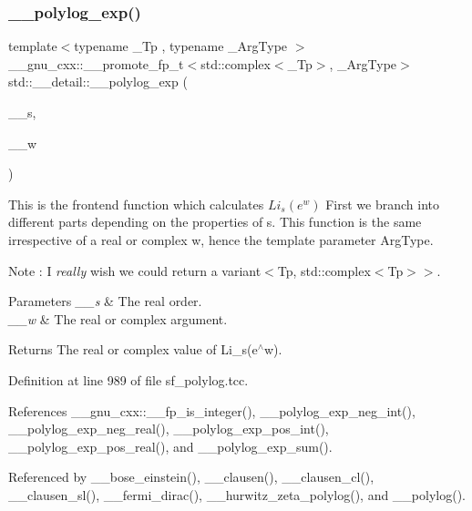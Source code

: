 \subsubsection{\texorpdfstring{\+\_\+\+\_\+polylog\+\_\+exp()}{\_\_polylog\_exp()}}
{\footnotesize\ttfamily template$<$typename \+\_\+\+Tp , typename \+\_\+\+Arg\+Type $>$ \\
\+\_\+\+\_\+gnu\+\_\+cxx\+::\+\_\+\+\_\+promote\+\_\+fp\+\_\+t$<$std\+::complex$<$\+\_\+\+Tp$>$, \+\_\+\+Arg\+Type$>$ std\+::\+\_\+\+\_\+detail\+::\+\_\+\+\_\+polylog\+\_\+exp (\begin{DoxyParamCaption}\item[{\+\_\+\+Tp}]{\+\_\+\+\_\+s,  }\item[{\+\_\+\+Arg\+Type}]{\+\_\+\+\_\+w }\end{DoxyParamCaption})}

This is the frontend function which calculates $ Li_s(e^w) $ First we branch into different parts depending on the properties of s. This function is the same irrespective of a real or complex w, hence the template parameter Arg\+Type.

\begin{DoxyNote}{Note}
\+: I {\itshape really} wish we could return a variant$<$Tp, std\+::complex$<$\+Tp$>$$>$.
\end{DoxyNote}

\begin{DoxyParams}{Parameters}
{\em \+\_\+\+\_\+s} & The real order. \\
\hline
{\em \+\_\+\+\_\+w} & The real or complex argument. \\
\hline
\end{DoxyParams}
\begin{DoxyReturn}{Returns}
The real or complex value of Li\+\_\+s(e$^\wedge$w). 
\end{DoxyReturn}


Definition at line 989 of file sf\+\_\+polylog.\+tcc.



References \+\_\+\+\_\+gnu\+\_\+cxx\+::\+\_\+\+\_\+fp\+\_\+is\+\_\+integer(), \+\_\+\+\_\+polylog\+\_\+exp\+\_\+neg\+\_\+int(), \+\_\+\+\_\+polylog\+\_\+exp\+\_\+neg\+\_\+real(), \+\_\+\+\_\+polylog\+\_\+exp\+\_\+pos\+\_\+int(), \+\_\+\+\_\+polylog\+\_\+exp\+\_\+pos\+\_\+real(), and \+\_\+\+\_\+polylog\+\_\+exp\+\_\+sum().



Referenced by \+\_\+\+\_\+bose\+\_\+einstein(), \+\_\+\+\_\+clausen(), \+\_\+\+\_\+clausen\+\_\+cl(), \+\_\+\+\_\+clausen\+\_\+sl(), \+\_\+\+\_\+fermi\+\_\+dirac(), \+\_\+\+\_\+hurwitz\+\_\+zeta\+\_\+polylog(), and \+\_\+\+\_\+polylog().

